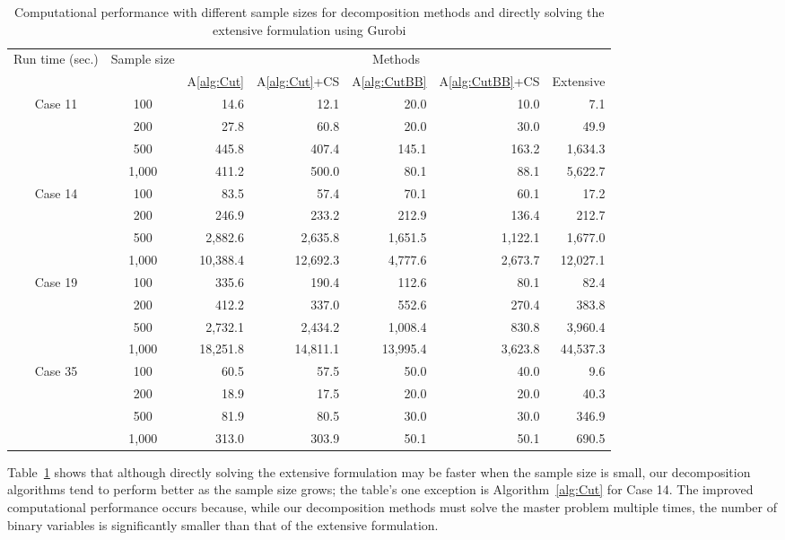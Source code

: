 \documentclass[11pt]{article}
\begin{document}
	\begin{table}[ht]
		\centering		
		\begin{tabular}{ c | c | r r r r r }
			\hline
			\multirow{2}{*}{Run time (sec.)} & \multirow{2}{*}{Sample size} & \multicolumn{5}{c}{Methods} \\ \cline{3-7}
			& & A\ref{alg:Cut} & A\ref{alg:Cut}+CS & A\ref{alg:CutBB} & A\ref{alg:CutBB}+CS & Extensive  \\ \hline
			\multirow{4}{*}{Case 11} & 100 & 14.6 & 12.1 & 20.0 & 10.0 & 7.1 \\
			& 200 & 27.8 & 60.8 & 20.0 & 30.0 & 49.9\\
			& 500 & 445.8 & 407.4 & 145.1 & 163.2 & 1,634.3\\
			& 1,000 & 411.2 & 500.0 & 80.1 & 88.1 & 5,622.7\\
			\hline
			\multirow{4}{*}{Case 14} & 100 & 83.5 & 57.4 & 70.1 & 60.1 & 17.2 \\
			& 200 & 246.9 & 233.2 & 212.9 & 136.4 & 212.7 \\
			& 500 & 2,882.6 & 2,635.8 & 1,651.5 & 1,122.1 & 1,677.0 \\
			& 1,000 & 10,388.4 & 12,692.3 & 4,777.6 & 2,673.7 & 12,027.1 \\
			\hline
			\multirow{4}{*}{Case 19} & 100 & 335.6 & 190.4 & 112.6 & 80.1 & 82.4 \\
			& 200 & 412.2 & 337.0 & 552.6 & 270.4 & 383.8 \\
			& 500 & 2,732.1 & 2,434.2 & 1,008.4 & 830.8 & 3,960.4 \\
			& 1,000 & 18,251.8 & 14,811.1 & 13,995.4 & 3,623.8 & 44,537.3 \\
			\hline
			\multirow{4}{*}{Case 35} & 100 & 60.5 & 57.5 & 50.0 & 40.0 & 9.6 \\
			& 200 & 18.9 & 17.5 & 20.0 & 20.0 & 40.3 \\
			& 500 & 81.9 & 80.5 & 30.0 & 30.0 & 346.9 \\
			& 1,000 & 313.0 & 303.9 & 50.1 & 50.1 & 690.5 \\
			\hline
		\end{tabular}
		\caption{Computational performance with different sample sizes for decomposition methods and directly solving the extensive formulation using Gurobi}
		\label{table:time}
	\end{table}
	
	Table~\ref{table:time} shows that although directly solving the extensive formulation may be faster when the sample size is small, our decomposition algorithms tend to perform better as the sample size grows; the table's one exception is Algorithm~\ref{alg:Cut} for Case 14. 
	The improved computational performance occurs because, while our decomposition methods must solve the master problem multiple times, the number of binary variables is significantly smaller than that of the extensive formulation. %
	
\end{document}
